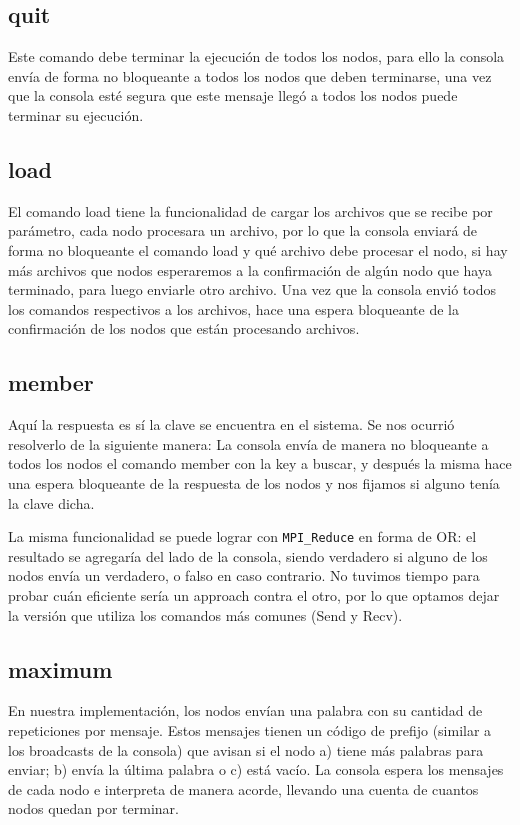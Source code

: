 \subsection{quit}

Este comando debe terminar la ejecución de todos los nodos, para ello la consola envía de forma no bloqueante a todos los nodos que deben terminarse, una vez que la consola esté segura que este mensaje llegó a todos los nodos puede terminar su ejecución.

\subsection{load}

El comando load tiene la funcionalidad de cargar los archivos que se recibe por parámetro, cada nodo procesara un archivo, por lo que la consola enviará de forma no bloqueante el comando load y qué archivo debe procesar el nodo, si hay más archivos que nodos esperaremos a la confirmación de algún nodo que haya terminado, para luego enviarle otro archivo. Una vez que la consola envió todos los comandos respectivos a los archivos, hace una espera bloqueante de la confirmación de los nodos que están procesando archivos.

\subsection{member}

Aquí la respuesta es sí la clave se encuentra en el sistema. Se nos ocurrió resolverlo de la siguiente manera: La consola envía de manera no bloqueante a todos los nodos el comando member con la key a buscar, y después la misma hace una espera bloqueante de la respuesta de los nodos y nos fijamos si alguno tenía la clave dicha.

La misma funcionalidad se puede lograr con \texttt{MPI\_Reduce} en forma de OR: el resultado se agregaría del lado de la consola, siendo verdadero si alguno de los nodos envía un verdadero, o falso en caso contrario. No tuvimos tiempo para probar cuán eficiente sería un approach contra el otro, por lo que optamos dejar la versión que utiliza los comandos más comunes (Send y Recv).

\subsection{maximum}

En nuestra implementación, los nodos envían una palabra con su cantidad de repeticiones por mensaje. Estos mensajes tienen un código de prefijo (similar a los broadcasts de la consola) que avisan si el nodo a) tiene más palabras para enviar; b) envía la última palabra o c) está vacío. La consola espera los mensajes de cada nodo e interpreta de manera acorde, llevando una cuenta de cuantos nodos quedan por terminar.

